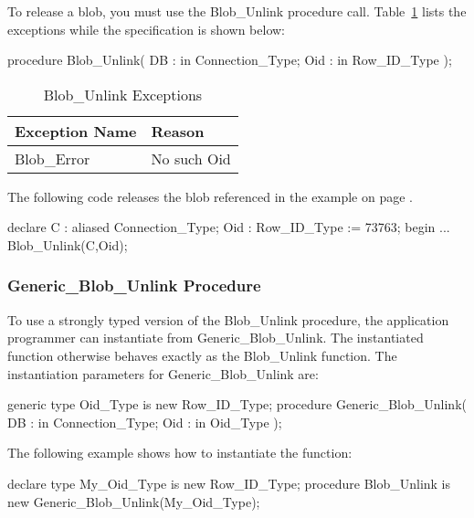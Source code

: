 \documentclass[english,letterpaper]{book}
\begin{document}
To release a blob, you must use the Blob\_Unlink
procedure call. Table~\ref{t:blbunlkx} lists the exceptions while the specification
is shown below:

\begin{Code}
procedure Blob_Unlink(
   DB :  in Connection_Type;
   Oid : in Row_ID_Type
);
\end{Code}

\begin{table}
   \begin{center}
      \begin{tabular}{ll}
         Exception Name    &  Reason\\
         \hline 
         Blob\_Error       &  No such Oid\\
      \end{tabular}
   \end{center}
   \caption{Blob\_Unlink Exceptions}\label{t:blbunlkx}
\end{table}

The following code releases the blob referenced in the example on
page \pageref{Example-code-with-OID-73763}.

\begin{Example}
declare
   C :   aliased Connection_Type;
   Oid : Row_ID_Type := 73763;
begin
   ...
   Blob_Unlink(C,Oid);
\end{Example}

\subsubsection{Generic\_Blob\_Unlink Procedure}

To use a strongly typed version of the Blob\_Unlink procedure, the
application programmer can instantiate from Generic\_Blob\_Unlink.
The instantiated function otherwise behaves exactly as the Blob\_Unlink
function. The instantiation parameters for Generic\_Blob\_Unlink are:

\begin{Code}
generic
   type Oid_Type is new Row_ID_Type;
procedure Generic_Blob_Unlink(
   DB :  in Connection_Type;
   Oid : in Oid_Type
);
\end{Code}

The following example shows how to instantiate the function:

\begin{Example}
declare
   type My_Oid_Type is new Row_ID_Type;
   procedure Blob_Unlink is new 
      Generic_Blob_Unlink(My_Oid_Type);
\end{Example}
\end{document}
